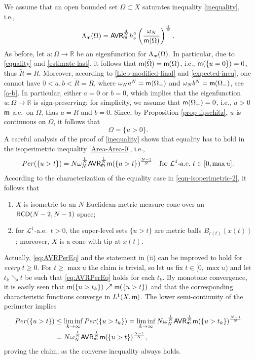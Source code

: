 \documentclass[11pt, reqno]{amsart}
\numberwithin{equation}{section}
\begin{document}
		We assume that an open bounded set $\Omega\subset X$ saturates inequality \eqref{inequality}, i.e., 
		\begin{equation}\label{equality}
			\Lambda_{\sf m}(\Omega)= {\sf AVR}_ {\sf m}^\frac{4}{N}h_\nu^4\left(\frac{\omega_N}{{\sf m}(\Omega)}\right)^\frac{4}{N}. 
		\end{equation}
	As before, let $u:\Omega\to \mathbb R$ be an eigenfunction for $\Lambda_{\sf m}(\Omega)$. In particular, due to	\eqref{equality} and \eqref{estimate-last}, it follows that ${\sf m}(\tilde \Omega)={\sf m}(\Omega)$, i.e., ${\sf m}(\{u=0\})=0$, thus $\tilde R=R$. Moreover,  according to 
	 \eqref{Lieb-modified-final} and \eqref{expected-ineq}, one cannot have $0<a, b<\tilde R=R$, where $\omega_N a^N={\sf m}(\Omega_+)$ and $\omega_N b^N={\sf m}(\Omega_-)$, see \eqref{a-b}.
	 In particular, either $a=0$ or $b=0$, which implies that the eigenfunction $u:\Omega\to \mathbb R$ is sign-preserving; for simplicity, we assume that  ${\sf m}(\Omega_-)=0$, i.e., $u>0$ ${\sf m}$-a.e.\ on $\Omega$, thus $a=R$ and $b=0$.  Since, by Proposition  \ref{prop-lipschitz}, $u$ is continuous on $\Omega$, it follows that 
  \begin{equation}\label{eq:Omegau>0}
  \Omega=\{u>0\}.
  \end{equation}
		A careful analysis of the proof of \eqref{inequality} shows that equality has to hold in the isoperimetric inequality \eqref{Area-Area-0}, i.e., 
		\begin{equation}\label{eq:AVRPerEq}
			{\rm Per}(\{u>t\})= N\omega_N^\frac{1}{N}{\sf AVR}_ {\sf m}^\frac{1}{N} {\sf m}(\{u>t\})^\frac{N-1}{N}  \quad \text{for}\ \mathcal{L}^1\text{-a.e.}\ t\in [0,\max u].
		\end{equation}
		According to the characterization of the equality case in \eqref{eqn-isoperimetric-2}, it follows that
		\begin{enumerate}
			\item[(i)] $X$ is isometric to an $N$-Euclidean   metric measure cone over an ${\sf RCD}(N-2,N-1)$ space;
			\item[(ii)] for $\mathcal L^1$-a.e.\ $t>0$, the super-level sets $\{u>t\}$ are metric balls  $ B_{r(t)}(x(t))$; moreover, $X$ is a cone with tip at $x(t)$.
		\end{enumerate}
		Actually, \eqref{eq:AVRPerEq} and the statement in (ii) can be improved to hold for \emph{every} $t\geq 0$. For $t\geq \max u$ the claim is trivial, so let us fix $t\in [0, \max u)$ and let $t_k\searrow t$ be such that  \eqref{eq:AVRPerEq} holds for each $t_k$. By monotone convergence, it is easily seen that ${\sf m}(\{u>t_k\})\nearrow {\sf m}(\{u>t\})$ and that the corresponding characteristic functions converge in $L^1(X, {\sf m})$.
		The lower semi-continuity of the perimeter implies 
		\begin{align*}
			{\rm Per}(\{u>t\})&\leq \liminf_{k\to \infty} {\rm Per}(\{u>t_k\})= \liminf_{k\to \infty} N\omega_N^\frac{1}{N}{\sf AVR}_ {\sf m}^\frac{1}{N} {\sf m}(\{u>t_k\})^\frac{N-1}{N} \\
			&=N\omega_N^\frac{1}{N}{\sf AVR}_ {\sf m}^\frac{1}{N} {\sf m}(\{u>t\})^\frac{N-1}{N},
		\end{align*}
		proving the claim, as the converse inequality always holds. 
\end{document}
